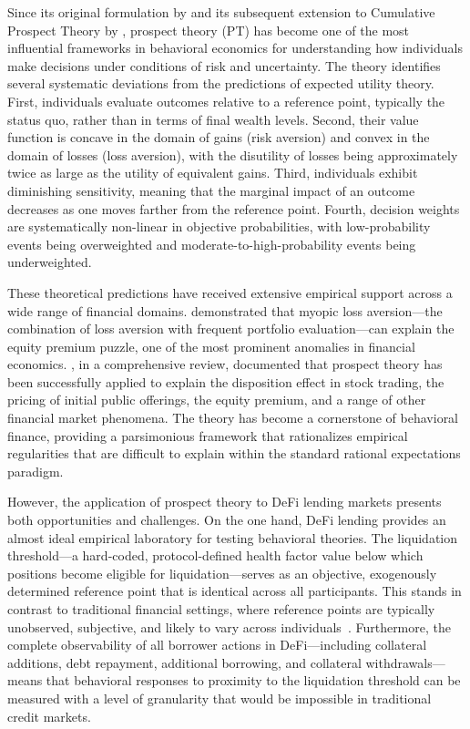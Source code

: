 Since its original formulation by \citet{kahneman1979prospect} and its subsequent extension to Cumulative Prospect Theory by \citet{tversky1992advances}, prospect theory (PT) has become one of the most influential frameworks in behavioral economics for understanding how individuals make decisions under conditions of risk and uncertainty. The theory identifies several systematic deviations from the predictions of expected utility theory. First, individuals evaluate outcomes relative to a reference point, typically the status quo, rather than in terms of final wealth levels. Second, their value function is concave in the domain of gains (risk aversion) and convex in the domain of losses (loss aversion), with the disutility of losses being approximately twice as large as the utility of equivalent gains. Third, individuals exhibit diminishing sensitivity, meaning that the marginal impact of an outcome decreases as one moves farther from the reference point. Fourth, decision weights are systematically non-linear in objective probabilities, with low-probability events being overweighted and moderate-to-high-probability events being underweighted.

These theoretical predictions have received extensive empirical support across a wide range of financial domains. \citet{benartzi1995myopic} demonstrated that myopic loss aversion—the combination of loss aversion with frequent portfolio evaluation—can explain the equity premium puzzle, one of the most prominent anomalies in financial economics. \citet{barberis2013thirty}, in a comprehensive review, documented that prospect theory has been successfully applied to explain the disposition effect in stock trading, the pricing of initial public offerings, the equity premium, and a range of other financial market phenomena. The theory has become a cornerstone of behavioral finance, providing a parsimonious framework that rationalizes empirical regularities that are difficult to explain within the standard rational expectations paradigm.

However, the application of prospect theory to DeFi lending markets presents both opportunities and challenges. On the one hand, DeFi lending provides an almost ideal empirical laboratory for testing behavioral theories. The liquidation threshold—a hard-coded, protocol-defined health factor value below which positions become eligible for liquidation—serves as an objective, exogenously determined reference point that is identical across all participants. This stands in contrast to traditional financial settings, where reference points are typically unobserved, subjective, and likely to vary across individuals~\cite{barberis2013thirty}. Furthermore, the complete observability of all borrower actions in DeFi—including collateral additions, debt repayment, additional borrowing, and collateral withdrawals—means that behavioral responses to proximity to the liquidation threshold can be measured with a level of granularity that would be impossible in traditional credit markets.

